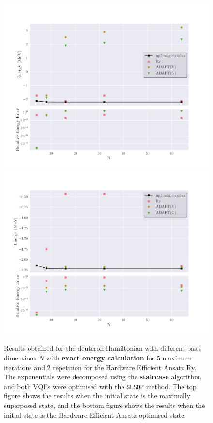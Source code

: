 \begin{figure}[ht]
    \centering
    \includegraphics[width=0.8\linewidth]{image/deuteron_result/why_opt_init/S_NE_SLSQP_max_iter=5_hw_rep=2_(2,6,5)deutron_energies.pdf}
    \includegraphics[width=0.8\linewidth]{image/deuteron_result/why_opt_init/S_NE_SLSQP_max_iter=5_hw_rep=2_opt_init_(2,6,5)deutron_energies.pdf}
    \caption{Results obtained for the deuteron Hamiltonian with different basis dimensions $ N $ with \textbf{exact energy calculation} for $ 5 $ maximum iterations and $ 2 $ repetition for the Hardware Efficient Ansatz Ry. The exponentials were decomposed using the \textbf{staircase} algorithm, and both VQEs were optimised with the \texttt{SLSQP} method. The top figure shows the results when the initial state is the maximally superposed state, and the bottom figure shows the results when the initial state is the Hardware Efficient Ansatz optimised state.}
    \label{fig:whyoptinit}
\end{figure}

